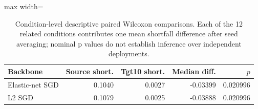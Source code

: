 \begin{table}[!tbp]
\centering
\caption{Condition-level descriptive paired Wilcoxon comparisons. Each of the 12 related conditions contributes one mean shortfall difference after seed averaging; nominal p values do not establish inference over independent deployments.}
\label{primary-tab:shift_level_tests}
\footnotesize
\setlength{\tabcolsep}{3pt}
\begin{adjustbox}{max width=\columnwidth}
\begin{tabular}{lrrrr}
\toprule
Backbone & Source short. & Tgt10 short. & Median diff. & $p$ \\
\midrule
Elastic-net SGD & 0.1040 & 0.0027 & -0.03399 & 0.020996 \\
L2 SGD & 0.1079 & 0.0025 & -0.03888 & 0.020996 \\
\bottomrule
\end{tabular}
\end{adjustbox}
\end{table}
